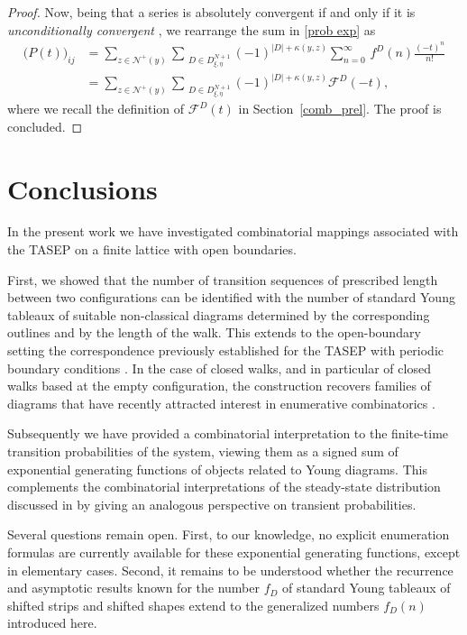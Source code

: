 \documentclass{article}
\begin{document}
\begin{proof}
    Now, being that a series is absolutely convergent if and only if it is \textit{unconditionally convergent} \cite[Theorem~3.56]{rudin1976principles}, we  rearrange the sum in \eqref{prob exp} as
    \begin{equation}    
    \label{final sum}
    \begin{split}
    \big(P(t)\big)_{ij}&=\sum_{z\in\mathcal{N}^+(y)}\sum_{\ \,  D\in D^{N+1}_{\xi,\eta}}(-1)^{|D|+\kappa(y,z)}\sum_{n=0}^\infty\,f^D(n)\frac{(-t)^n}{n!}\\
    &=\sum_{z\in\mathcal{N}^+(y)}\sum_{\ \, D\in D^{N+1}_{\xi,\eta}} (-1)^{|D|+\kappa(y,z)}\mathcal{F}^D(-t),
    \end{split}
    \end{equation}
     where we recall the definition of $\mathcal{F}^D(t)$ in Section~\ref{comb_prel}. The proof is concluded.
\end{proof}

\section{Conclusions}

In the present work we have investigated combinatorial mappings associated with the
TASEP on a finite lattice with open boundaries.

First, we showed that the number of transition sequences of prescribed length between
two configurations can be identified with the number of standard Young tableaux of
suitable non-classical diagrams determined by the corresponding outlines and by the
length of the walk. This extends to the open-boundary setting the correspondence
previously established for the TASEP with periodic boundary conditions
\cite{elizalde2022walks}. In the case of closed walks, and in particular of closed
walks based at the empty configuration, the construction recovers families of diagrams
that have recently attracted interest in enumerative combinatorics
\cite{periodiPPartitions,Sun2015EnumerationOS,VeraLopez2017}.

Subsequently we have provided a combinatorial interpretation to the finite-time transition probabilities of the system, viewing them as a signed sum of exponential generating functions of objects related to Young diagrams. This
complements the combinatorial interpretations of the steady-state distribution discussed
in \cite{Blythe_2007} by giving an analogous perspective on transient probabilities.

Several questions remain open. First, to our knowledge, no explicit enumeration formulas
are currently available for these exponential generating functions, except in elementary
cases. Second, it remains to be understood whether the recurrence and asymptotic results
known for the number \(f_D\) of standard Young tableaux of shifted strips and shifted
shapes extend to the generalized numbers \(f_D(n)\) introduced here.
\end{document}

